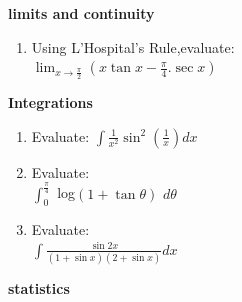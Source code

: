 \documentclass[12pt,-letter paper]{article}
\providecommand{\brak}[1]{\ensuremath{\left(#1\right)}}
\begin{document}
\begin{center}
	\textbf{limits and continuity}
\end{center}
\begin{enumerate}
	\item Using L'Hospital's Rule,evaluate: \\
		$\lim_{x\to\frac{\pi}{2}}\brak{x\tan{x}-\frac{\pi}{4}.\sec{x}}$
\end{enumerate}
\begin{center}
	\textbf{Integrations}
\end{center}
\begin{enumerate}
	\item Evaluate: $\int \frac{1}{x^2} \sin^2 \brak{\frac{1}{x}} dx $
	\item Evaluate: \\
		$\int_{0}^\frac{\pi}{4}$ log\brak{1+\tan{\theta}} $d\theta$
	\item Evaluate: \\
		$\int \frac{\sin2x} {\brak{1+\sin{x}}\brak{2+\sin{x}}}dx$
\end{enumerate}
\begin{center}
	\textbf{statistics}
\end{center}
\end{document}
